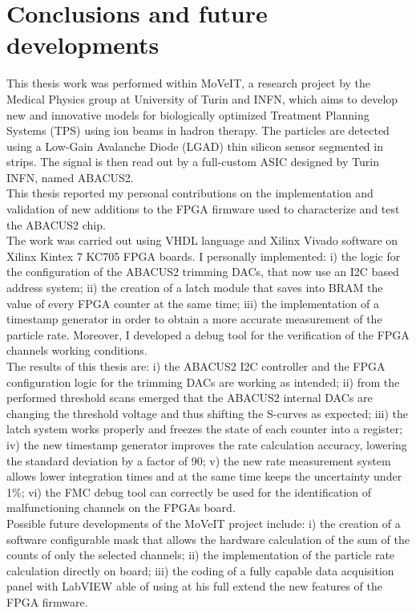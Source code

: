 \chapter*{Conclusions and future developments}
\noindent This thesis work was performed within MoVeIT, a research
project by the Medical Physics group at University of Turin
and INFN, which aims to develop new and
innovative models for biologically optimized Treatment
Planning Systems (TPS) using ion beams in hadron therapy.
The particles are detected using a Low-Gain Avalanche Diode
(LGAD) thin silicon sensor segmented in strips. The signal
is then read out by a full-custom ASIC designed by Turin
INFN, named ABACUS2.\\
\noindent This thesis reported my personal contributions on the
implementation and validation of new additions to the
FPGA firmware used to characterize and test the ABACUS2
chip.\\
\noindent The work was carried out using VHDL language and
Xilinx Vivado software on Xilinx Kintex 7 KC705 FPGA boards. 
I personally implemented:
i) the logic for the configuration of the ABACUS2 trimming
DACs, that now use an I2C based address system;
ii) the creation of a latch module that saves into BRAM the
value of every FPGA counter at the same time;
iii) the implementation of a timestamp generator in order
to obtain a more accurate measurement of the particle rate.
Moreover, I developed a debug tool for the verification
of the FPGA channels working conditions.\\
\noindent The results of this thesis are:
i) the ABACUS2 I2C controller and the FPGA configuration
logic for the trimming DACs are working as intended; 
ii) from the performed threshold scans emerged that the ABACUS2
internal DACs are changing the threshold voltage and thus
shifting the S-curves as expected;
iii) the latch system works properly and freezes the state
of each counter into a register;
iv) the new timestamp generator improves the rate
calculation accuracy, lowering the standard deviation by a factor of 90; 
v) the new rate measurement system allows lower integration times
and at the same time keeps the uncertainty under 1\%;
vi) the FMC debug tool can correctly be used for the identification
of malfunctioning channels on the FPGAs board.\\
\noindent Possible future developments of the MoVeIT project
include:
i) the creation of a software configurable mask that allows
the hardware calculation of the sum of the counts of only
the selected channels;
ii) the implementation of the particle rate calculation directly
on board;
iii) the coding of a fully capable data acquisition panel with
LabVIEW able of using at his full extend the new features of the
FPGA firmware.



